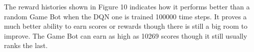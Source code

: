 The reward histories shown in Figure 10 indicates how it performs better than a random Game Bot when the DQN one is trained 100000 time steps. It proves a much better ability to earn scores or rewards though there is still a big room to improve. The Game Bot can earn as high as 10269 scores though it still usually ranks the last.


%
%


\vfill
